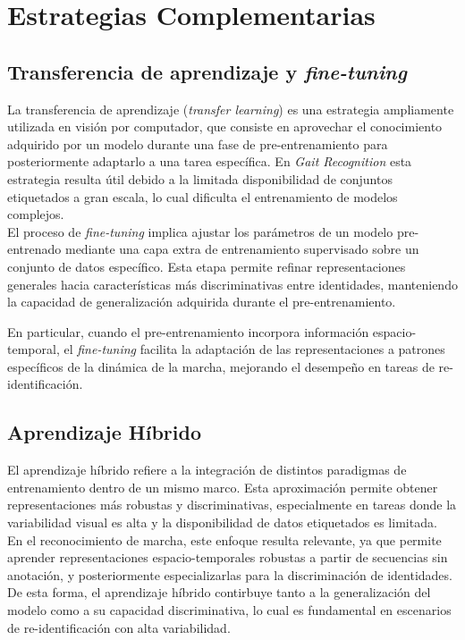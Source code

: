 \section{Estrategias Complementarias}

\subsection{Transferencia de aprendizaje y \textit{fine-tuning}}

La transferencia de aprendizaje (\textit{transfer learning}) es una estrategia ampliamente utilizada en visión por computador, que consiste en aprovechar el conocimiento adquirido por un modelo durante una fase de pre-entrenamiento para posteriormente adaptarlo a una tarea específica. En \textit{Gait Recognition} esta estrategia resulta útil debido a la limitada disponibilidad de conjuntos etiquetados a gran escala, lo cual dificulta el entrenamiento de modelos complejos. \\
El proceso de \textit{fine-tuning} implica ajustar los parámetros de un modelo pre-entrenado mediante una capa extra de entrenamiento supervisado sobre un conjunto de datos específico. Esta etapa permite refinar representaciones generales hacia características más discriminativas entre identidades, manteniendo la capacidad de generalización adquirida durante el pre-entrenamiento.

En particular, cuando el pre-entrenamiento incorpora información espacio-temporal, el \textit{fine-tuning} facilita la adaptación de las representaciones a patrones específicos de la dinámica de la marcha, mejorando el desempeño en tareas de re-identificación.

\subsection{Aprendizaje Híbrido}

El aprendizaje híbrido refiere a la integración de distintos paradigmas de entrenamiento dentro de un mismo marco. Esta aproximación permite obtener representaciones más robustas y discriminativas, especialmente en tareas donde la variabilidad visual es alta y la disponibilidad de datos etiquetados es limitada. \\
En el reconocimiento de marcha, este enfoque resulta relevante, ya que permite aprender representaciones espacio-temporales robustas a partir de secuencias sin anotación, y posteriormente especializarlas para la discriminación de identidades. \\
De esta forma, el aprendizaje híbrido contirbuye tanto a la generalización del modelo como a su capacidad discriminativa, lo cual es fundamental en escenarios de re-identificación con alta variabilidad.

